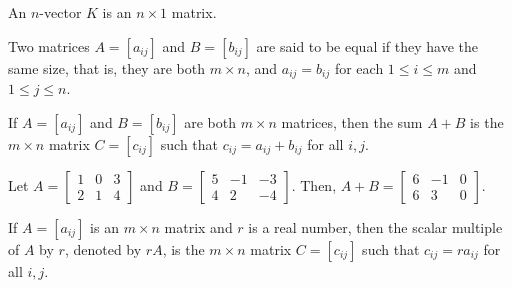     \begin{dfn}[\(n\)-vector]
        An \(n\)-vector \(K\) is an \(n \times 1\) matrix.
    \end{dfn}

    \begin{dfn}
        Two matrices \(A = [a_{ij}]\) and \(B = [b_{ij}]\) are said to be equal if they have the same size, that is, they are both \(m \times n\), and
        \(a_{ij} = b_{ij}\) for each \(1 \leq i \leq m\) and \(1 \leq j \leq n\).
    \end{dfn}

    \begin{dfn}
        If \(A = [a_{ij}]\) and \(B = [b_{ij}]\) are both \(m \times n\) matrices, then the sum \(A + B\) is the \(m \times n\) matrix \(C = [c_{ij}]\) such that \(c_{ij} = a_{ij} + b_{ij}\) for all \(i, j\).
    \end{dfn}

    \begin{example}
        Let \(\displaystyle A = \begin{bmatrix}
            1 & 0 & 3 \\ 2 & 1 & 4
        \end{bmatrix}\) and \(B = \begin{bmatrix}
            5 & -1 & -3 \\ 4 & 2 & -4
        \end{bmatrix}\). Then, \(A + B = \begin{bmatrix}
            6 & -1 & 0 \\ 6 & 3 & 0
        \end{bmatrix}.\)
    \end{example}

    \begin{dfn}
        If \(A = [a_{ij}]\) is an \(m \times n\) matrix and \(r\) is a real number, then the scalar multiple of \(A\) by \(r\), denoted by \(rA\), is the \(m \times n\) matrix \(C = [c_{ij}]\) such that \(c_{ij} = ra_{ij}\) for all \(i, j\).
    \end{dfn}

